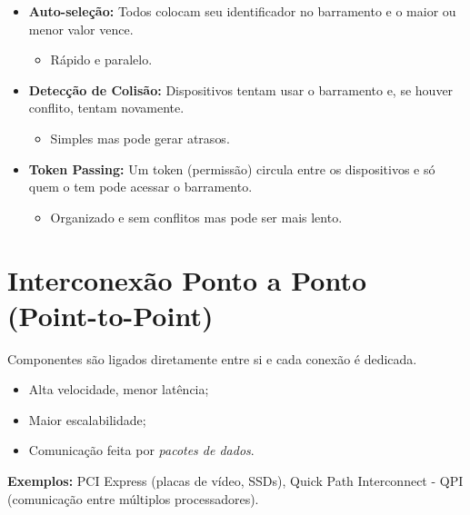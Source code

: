 \documentclass{article}
\begin{document}
\begin{itemize}
    \item \textbf{Auto-seleção:} Todos colocam seu identificador no barramento e o maior ou menor valor vence.
    \begin{itemize}
        \item Rápido e paralelo.
    \end{itemize}

    \item \textbf{Detecção de Colisão:} Dispositivos tentam usar o barramento e, se houver conflito, tentam novamente.
    \begin{itemize}
        \item Simples mas pode gerar atrasos.
    \end{itemize}

\item \textbf{Token Passing:} Um token (permissão) circula entre os dispositivos e só quem o tem pode acessar o barramento.
    \begin{itemize}
        \item Organizado e sem conflitos mas pode ser mais lento.
    \end{itemize}
\end{itemize}

\section{Interconexão Ponto a Ponto (Point-to-Point)}
Componentes são ligados diretamente entre si e cada conexão é dedicada.

\begin{itemize}
    \item Alta velocidade, menor latência;
    \item Maior escalabilidade;
    \item Comunicação feita por \textit{pacotes de dados}.
\end{itemize}

\textbf{Exemplos:} PCI Express (placas de vídeo, SSDs), Quick Path Interconnect - QPI (comunicação entre múltiplos processadores).
\end{document}
